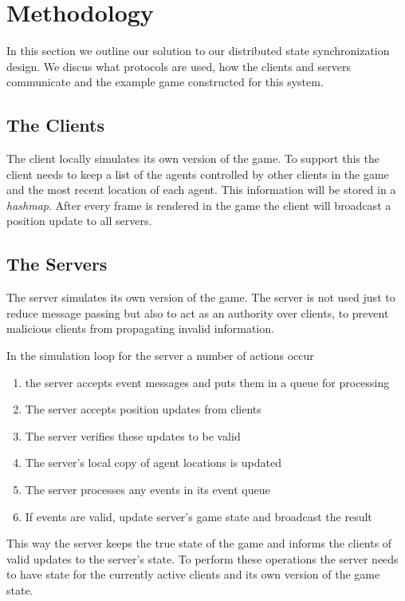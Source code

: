 
\section{Methodology}
\label{sec:methodology}

	In this section we outline our solution to our distributed state synchronization design. We discus what protocols are used, how the clients and servers communicate and the example game constructed for this system.
	
\subsection{The Clients}

	The client locally simulates its own version of the game. To support this the client needs to keep a list of the agents controlled by other clients in the game and the most recent location of each agent. This information will be stored in a \emph{hashmap}. After every frame is rendered in the game the client will broadcast a position update to all servers.
	
\subsection{The Servers}

	The server simulates its own version of the game. The server is not used just to reduce message passing but also to act as an authority over clients, to prevent malicious clients from propagating invalid information.
	
	In the simulation loop for the server a number of actions occur
	\begin{enumerate}[topsep=2pt,itemsep=-1ex,partopsep=1ex,parsep=1ex]
		\item the server accepts event messages and puts them in a queue for processing
		\item The server accepts position updates from clients
		\item The server verifies these updates to be valid
		\item The server's local copy of agent locations is updated
		\item The server processes any events in its event queue
		\item If events are valid, update server's game state and broadcast the result
	\end{enumerate}
	
	This way the server keeps the true state of the game and informs the clients of valid updates to the server's state. To perform these operations the server needs to have state for the currently active clients and its own version of the game state.

